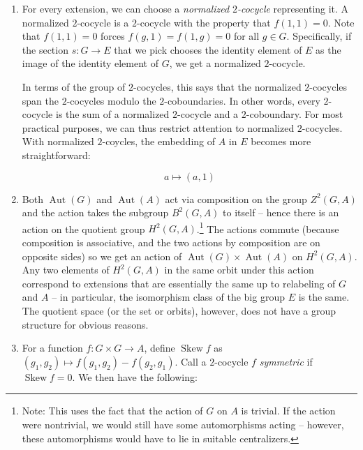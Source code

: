 \documentclass[10pt]{amsart}
\newcommand{\Skew}{\operatorname{Skew}}
\newcommand{\Aut}{\operatorname{Aut}}
\begin{document}
\begin{enumerate}
\item For every extension, we can choose a {\em normalized
  $2$-cocycle} representing it. A normalized $2$-cocycle is a
  $2$-cocycle with the property that $f(1,1) = 0$. Note that $f(1,1) =
  0$ forces $f(g,1) = f(1,g) = 0$ for all $g \in G$. Specifically, if
  the section $s:G \to E$ that we pick chooses the identity element of
  $E$ as the image of the identity element of $G$, we get a normalized
  $2$-cocycle.

  In terms of the group of $2$-cocycles, this says that the normalized
  $2$-cocycles span the $2$-cocycles modulo the $2$-coboundaries. In
  other words, every $2$-cocycle is the sum of a normalized
  $2$-cocycle and a $2$-coboundary. For most practical purposes, we
  can thus restrict attention to normalized $2$-cocycles. With
  normalized $2$-coycles, the embedding of $A$ in $E$ becomes more
  straightforward:

  $$a \mapsto (a,1)$$

\item Both $\Aut(G)$ and $\Aut(A)$ act via composition on the group
  $Z^2(G,A)$ and the action takes the subgroup $B^2(G,A)$ to itself --
  hence there is an action on the quotient group
  $H^2(G,A)$.\footnote{Note: This uses the fact that the action of $G$
  on $A$ is trivial. If the action were nontrivial, we would still
  have some automorphisms acting -- however, these automorphisms would
  have to lie in suitable centralizers.} The actions commute (because
  composition is associative, and the two actions by composition are
  on opposite sides) so we get an action of $\Aut(G) \times \Aut(A)$
  on $H^2(G,A)$. Any two elements of $H^2(G,A)$ in the same orbit
  under this action correspond to extensions that are essentially the
  same up to relabeling of $G$ and $A$ -- in particular, the
  isomorphism class of the big group $E$ is the same. The quotient
  space (or the set or orbits), however, does not have a group
  structure for obvious reasons.

\item For a function $f:G \times G \to A$, define $\Skew f$ as
  $(g_1,g_2) \mapsto f(g_1,g_2) - f(g_2,g_1)$. Call a $2$-cocycle $f$
  {\em symmetric} if $\Skew f = 0$. We then have the following:


\end{enumerate}
\end{document}
